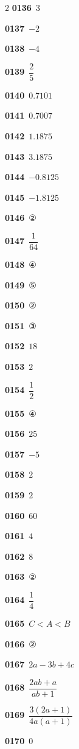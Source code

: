 \documentclass[10pt,a4paper]{article}
\begin{document}
\begin{multicols}{2}
\noindent\textbf{0136}\ $3$\par
\noindent\textbf{0137}\ $-2$\par
\noindent\textbf{0138}\ $-4$\par
\noindent\textbf{0139}\ $\dfrac{2}{5}$\par
\noindent\textbf{0140}\ $0.7101$\par
\noindent\textbf{0141}\ $0.7007$\par
\noindent\textbf{0142}\ $1.1875$\par
\noindent\textbf{0143}\ $3.1875$\par
\noindent\textbf{0144}\ $-0.8125$\par
\noindent\textbf{0145}\ $-1.8125$\par
\noindent\textbf{0146}\ ②\par
\noindent\textbf{0147}\ $\dfrac{1}{64}$\par
\noindent\textbf{0148}\ ④\par
\noindent\textbf{0149}\ ⑤\par
\noindent\textbf{0150}\ ②\par
\noindent\textbf{0151}\ ③\par
\noindent\textbf{0152}\ $18$\par
\noindent\textbf{0153}\ $2$\par
\noindent\textbf{0154}\ $\dfrac{1}{2}$\par
\noindent\textbf{0155}\ ④\par
\noindent\textbf{0156}\ $25$\par
\noindent\textbf{0157}\ $-5$\par
\noindent\textbf{0158}\ $2$\par
\noindent\textbf{0159}\ $2$\par
\noindent\textbf{0160}\ $60$\par
\noindent\textbf{0161}\ $4$\par
\noindent\textbf{0162}\ $8$\par
\noindent\textbf{0163}\ ②\par
\noindent\textbf{0164}\ $\dfrac{1}{4}$\par
\noindent\textbf{0165}\ $C<A<B$\par
\noindent\textbf{0166}\ ②\par
\noindent\textbf{0167}\ $2a-3b+4c$\par
\noindent\textbf{0168}\ $\dfrac{2ab+a}{ab+1}$\par
\noindent\textbf{0169}\ $\dfrac{3(2a+1)}{4a(a+1)}$\par
\noindent\textbf{0170}\ $0$\par

\end{multicols}
\end{document}
